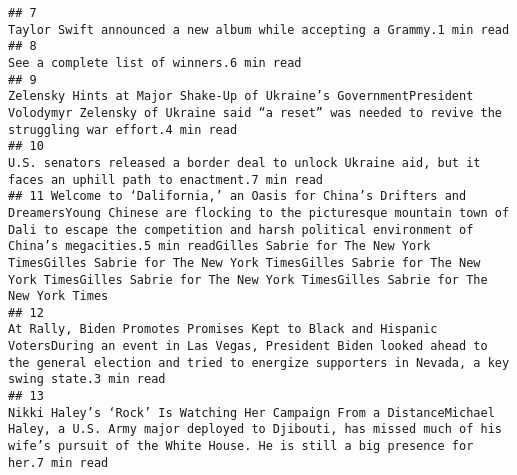\documentclass[
]{article}
\begin{document}
\begin{verbatim}
## 7                                                                                                                                                                                                                                                                                                                                                 Taylor Swift announced a new album while accepting a Grammy.1 min read
## 8                                                                                                                                                                                                                                                                                                                                                                              See a complete list of winners.6 min read
## 9                                                                                                                                                                                                                                               Zelensky Hints at Major Shake-Up of Ukraine’s GovernmentPresident Volodymyr Zelensky of Ukraine said “a reset” was needed to revive the struggling war effort.4 min read
## 10                                                                                                                                                                                                                                                                                                       U.S. senators released a border deal to unlock Ukraine aid, but it faces an uphill path to enactment.7 min read
## 11 Welcome to ‘Dalifornia,’ an Oasis for China’s Drifters and DreamersYoung Chinese are flocking to the picturesque mountain town of Dali to escape the competition and harsh political environment of China’s megacities.5 min readGilles Sabrie for The New York TimesGilles Sabrie for The New York TimesGilles Sabrie for The New York TimesGilles Sabrie for The New York TimesGilles Sabrie for The New York Times
## 12                                                                                                                                                                                        At Rally, Biden Promotes Promises Kept to Black and Hispanic VotersDuring an event in Las Vegas, President Biden looked ahead to the general election and tried to energize supporters in Nevada, a key swing state.3 min read
## 13                                                                                                                                                                                           Nikki Haley’s ‘Rock’ Is Watching Her Campaign From a DistanceMichael Haley, a U.S. Army major deployed to Djibouti, has missed much of his wife’s pursuit of the White House. He is still a big presence for her.7 min read

\end{verbatim}
\end{document}
